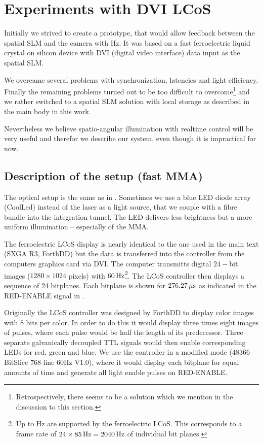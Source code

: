 \chapter{Experiments with DVI LCoS}
\label{sec:dvi}
\begin{summary}
  Initially we strived to create a prototype, that would allow
  feedback between the spatial SLM and the camera with
  \unit[60]{Hz}. It was based on a fast ferroelectric liquid crystal
  on silicon device with DVI (digital video interface) data input as
  the spatial SLM.
  
  We overcame several problems with synchronization, latencies and
  light efficiency. Finally the remaining problems turned out to be
  too difficult to overcome\footnote{Retrospectively, there seems to
    be a solution which we mention in the discussion to this section.}
  and we rather switched to a spatial SLM solution with local storage
  as described in the main body in this work.

  Nevertheless we believe spatio-angular illumination with realtime
  control will be very useful and therefor we describe our system,
  even though it is impractical for now.
\end{summary}

\section{Description of the setup (fast MMA)}
The optical setup is the same as in . Sometimes
we use a blue LED diode array (CoolLed) instead of the laser as a
light source, that we couple with a fibre bundle into the integration
tunnel. The LED delivers less brightness but a more uniform
illumination -- especially of the MMA.

The ferroelectric LCoS display is nearly identical to the one used in
the main text (SXGA R3, ForthDD) but the data is transferred into the
controller from the computers graphics card via DVI. The computer
transmitts digital $24-$bit images ($1280\times1024$ pixels) with
$\unit[60]{Hz}$\footnote{Up to \unit[85]{Hz} are supported by the
  ferroelectric LCoS. This corresponds to a frame rate of
  $24\times\unit[85]{Hz}=\unit[2040]{Hz}$ of individual bit
  planes.}. The LCoS controller then displays a sequence of 24
bitplanes. Each bitplane is shown for $\unit[276.27]{\mu s}$ as
indicated in the \textsf{RED-ENABLE} signal in .

Originally the LCoS controller was designed by ForthDD to display
color images with 8 bits per color. In order to do this it would
display three times eight images of pulses, where each pulse would be
half the length of its predecessor. Three separate galvanically
decoupled TTL signals would then enable corresponding LEDs for red,
green and blue. We use the controller in a modified mode (48366
BitSlice 768-line 60Hz V1.0), where it would display each bitplane for
equal amounts of time and generate all light enable pulses on
\textsf{RED-ENABLE}.

